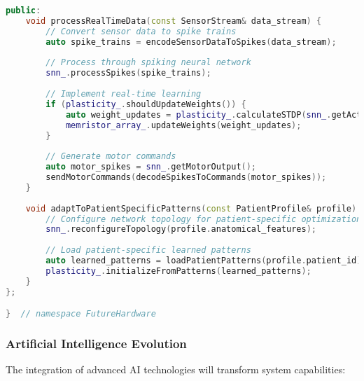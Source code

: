 \begin{lstlisting}[language=C++, caption={Future Hardware Abstraction Layer}, label={lst:future-hardware}]
public:
    void processRealTimeData(const SensorStream& data_stream) {
        // Convert sensor data to spike trains
        auto spike_trains = encodeSensorDataToSpikes(data_stream);
        
        // Process through spiking neural network
        snn_.processSpikes(spike_trains);
        
        // Implement real-time learning
        if (plasticity_.shouldUpdateWeights()) {
            auto weight_updates = plasticity_.calculateSTDP(snn_.getActivity());
            memristor_array_.updateWeights(weight_updates);
        }
        
        // Generate motor commands
        auto motor_spikes = snn_.getMotorOutput();
        sendMotorCommands(decodeSpikesToCommands(motor_spikes));
    }
    
    void adaptToPatientSpecificPatterns(const PatientProfile& profile) {
        // Configure network topology for patient-specific optimization
        snn_.reconfigureTopology(profile.anatomical_features);
        
        // Load patient-specific learned patterns
        auto learned_patterns = loadPatientPatterns(profile.patient_id);
        plasticity_.initializeFromPatterns(learned_patterns);
    }
};

}  // namespace FutureHardware
\end{lstlisting}

\subsubsection{Artificial Intelligence Evolution}
The integration of advanced AI technologies will transform system capabilities:

